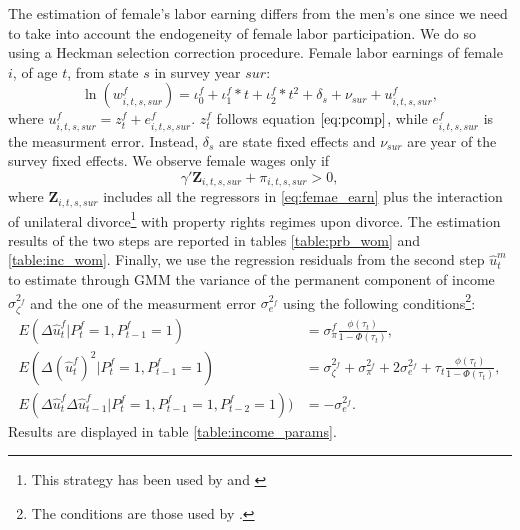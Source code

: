 \documentclass[12pt]{article}
\numberwithin{table}{section}
\begin{document}
The estimation of female's labor earning differs from the men's one since we need to take into account the endogeneity of female labor participation. We do so using a Heckman selection correction procedure. Female labor earnings of female $i$, of age $t$, from state $s$  in survey year $sur$:
\begin{equation}\label{eq:femae_earn}
\ln(w^f_{i,t,s,sur})=\iota^f_0+\iota^f_1*t+\iota^f_2*t^2+\delta_s+\nu_{sur}+u_{i,t,s,sur}^f,
\end{equation}
where $u_{i,t,s,sur}^f=z_t^f+e^f_{i,t,s,sur}$. $z_t^f$ follows equation $\ref{eq:pcomp}$, while $e^f_{i,t,s,sur}$ is the measurment error. Instead, $\delta_s$ are state fixed effects and $\nu_{sur}$ are year of the survey fixed effects. We observe female wages only if
\begin{equation}\label{eq:femae_part}
\gamma'\mathbf{Z}_{i,t,s,sur}+\pi_{i,t,s,sur}>0,
\end{equation}
where $\mathbf{Z}_{i,t,s,sur}$ includes all the regressors in \ref{eq:femae_earn} plus the interaction of unilateral divorce\footnote{This strategy has been used by \cite{voena2015} and \cite{reynoso2019}} with property rights regimes upon divorce. The estimation results of the two steps are reported in tables \ref{table:prb_wom} and \ref{table:inc_wom}. Finally, we use the regression residuals from the second step $\hat{u}_{t}^m$  to estimate through GMM the variance of the permanent component of income $\sigma_\zeta^{2_f}$ and the one of the measurment error $\sigma_e^{2_f}$ using the following conditions\footnote{The conditions are those used by \cite{low2018}.}:
\begin{equation}\label{eq:female_gmm}
\begin{split}
E(\Delta\hat{u}_{t}^f | P^f_t=1,P^f_{t-1}=1)&=\sigma_\pi^{f}\frac{\phi(\tau_t)}{1-\Phi(\tau_t)},\\
E(\Delta(\hat{u}_{t}^{f})^2 | P^f_t=1,P^f_{t-1}=1)&=\sigma_\zeta^{2_f}+\sigma_\pi^{2_f}+2\sigma_e^{2_f}+\tau_t\frac{\phi(\tau_t)}{1-\Phi(\tau_t)},\\
E(\Delta\hat{u}_{t}^f\Delta\hat{u}_{t-1}^f | P^f_t=1,P^f_{t-1}=1,P^f_{t-2}=1))&=-\sigma_e^{2_f}.
\end{split}
\end{equation}
Results are displayed in table \ref{table:income_params}.
\end{document}
